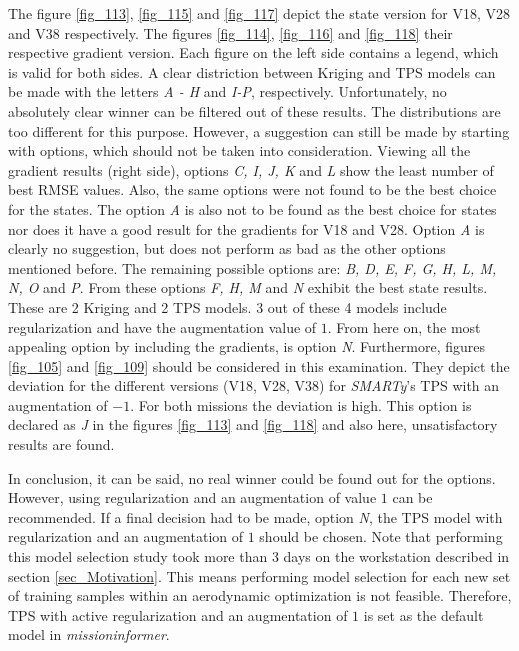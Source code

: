 The figure \ref{fig_113}, \ref{fig_115} and 
\ref{fig_117} depict the state version for 
V18, V28 and V38 respectively. The figures 
\ref{fig_114}, \ref{fig_116} and \ref{fig_118} 
their respective gradient version. Each figure 
on the left side contains a legend, which 
is valid for both sides. A clear distriction 
between Kriging and TPS models can be
made with the letters
\emph{A - H} and \emph{I-P}, respectively.
 Unfortunately,
no absolutely clear winner can be filtered out of these 
results. The distributions are too different for this purpose.
However, a suggestion can still be  made by 
starting with  options, which should not be 
taken into consideration.
Viewing all the gradient results (right side), 
options \emph{C, I, J, K} and \emph{L} show 
the least number of best RMSE values.
Also, the same options were not found 
to be the best choice for the states. 
The option \emph{A} is also not to be found 
as the best choice for states nor 
does it have a good result for the 
gradients for V18 and V28.  
Option \emph{A} is clearly no suggestion, but 
does not perform as bad as the other 
options mentioned before. The remaining 
possible options are: 
\emph{B, D, E, F, G, H, L, M, N, O} and 
\emph{P}. From these options 
\emph{F, H, M} and \emph{N} exhibit the 
best state results. These are 2 Kriging and 2 TPS models.
3 out of these 4 models include regularization and 
have the augmentation value of $1$. From here on, the most 
appealing option by including the gradients, 
is option \emph{N}.  
Furthermore, 
figures \ref{fig_105} 
and \ref{fig_109} should be considered 
in this examination. They  
depict the deviation for the 
different versions (V18, V28, V38) 
for \emph{SMARTy}'s TPS with 
an augmentation of $-1$. For both 
missions the deviation is high. This  
option 
is declared as \emph{J} in 
the figures \ref{fig_113} and 
\ref{fig_118} and also here, 
unsatisfactory results are found. \newline

In conclusion, it can be said, no real winner 
could be found out for the options. However, 
using regularization and an augmentation 
of value $1$ can be recommended. If a final 
decision had to be made, option \emph{N},
the TPS model with regularization
and an augmentation of $1$ should be chosen.
Note that performing this model selection study 
took more than 3 days on the workstation described 
in section \ref{sec_Motivation}.
This means performing
model selection for each new set of training samples 
within an aerodynamic optimization 
is not feasible. Therefore, TPS with 
active regularization and an augmentation 
of $1$ is set as the default model 
in \emph{missioninformer}.


